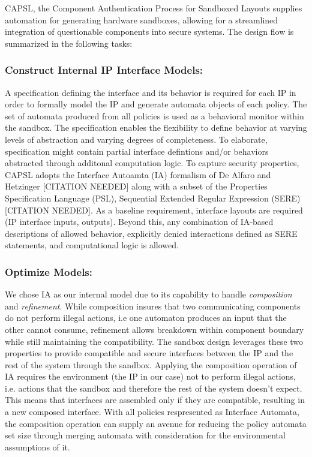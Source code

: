 \documentclass[sigconf]{acmart}
\theoremstyle{plain}
\theoremstyle{remark}
\begin{document}
CAPSL, the Component Authentication Process for Sandboxed Layouts supplies automation for generating hardware sandboxes, allowing for a streamlined integration of questionable components into secure systems. The design flow is summarized in the following tasks:

\subsubsection{Construct Internal IP Interface Models:}
A specification defining the interface and its behavior is required for each IP in order to formally model the IP and generate automata objects of each policy. The set of automata produced from all policies is used as a behavioral monitor within the sandbox. The specification enables the flexibility to define behavior at varying levels of abstraction and varying degrees of completeness. To elaborate, specification might contain partial interface defintions and/or behaviors abstracted through additonal computation logic. To capture security properties, CAPSL adopts the Interface Autoamta (IA) formalism of De Alfaro and Hetzinger [CITATION NEEDED] along with a subset of the Properties Specification Language (PSL), Sequential Extended Regular Expression (SERE) [CITATION NEEDED]. As a baseline requirement, interface layouts are required (IP interface inputs, outputs). Beyond this, any combination of IA-based descriptions of allowed behavior, explicitly denied interactions defined as SERE statements, and computational logic is allowed.


\subsubsection{Optimize Models:}
We chose IA as our internal model due to its capability to handle \textit{composition} and \textit{refinement}. While composition insures that two communicating components do not perform illegal actions, i.e one automaton produces an input that the other cannot consume, refinement allows breakdown within component boundary while still maintaining the compatibility. The sandbox design leverages these two properties to provide compatible and secure interfaces between the IP and the rest of the system through the sandbox. Applying the composition operation of IA requires the environment (the IP in our case) not to perform illegal actions, i.e. actions that the sandbox and therefore the rest of  the system doesn't expect. This means that interfaces are assembled only if they are compatible, resulting in a new composed interface. With all policies respresented as Interface Automata, the composition operation can supply an avenue for reducing the policy automata set size through merging automata with consideration for the environmental assumptions of it.
\end{document}
